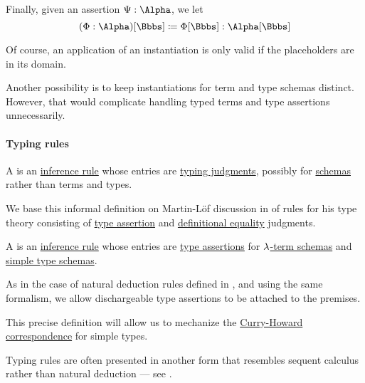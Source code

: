 \begin{definition}
\begin{thmenum}
     Finally, given an assertion \( \Psi: \Alpha \), we let
    \begin{equation}\label{eq:def:lambda_schema_instantiation/assertion}
      (\Phi: \Alpha)[\Bbbs] \coloneqq \Phi[\Bbbs]: \Alpha[\Bbbs]
    \end{equation}
  \end{thmenum}
\end{definition}
\begin{comments}
  \item Of course, an application of an instantiation is only valid if the placeholders are in its domain.

  \item Another possibility is to keep instantiations for term and type schemas distinct. However, that would complicate handling typed terms and type assertions unnecessarily.
\end{comments}

\paragraph{Typing rules}

\begin{concept}\label{con:typing_rule}
  A  is an \hyperref[def:inference_rule]{inference rule} whose entries are \hyperref[rem:typing_judgments]{typing judgments}, possibly for \hyperref[con:schemas_and_instances]{schemas} rather than terms and types.
\end{concept}
\begin{comments}
  \item We base this informal definition on Martin-L\"of discussion in \cite{MartinLöf1984IntTypeTheory} of rules for his type theory consisting of \hyperref[def:type_assertion]{type assertion} and \hyperref[con:definitional_equality]{definitional equality} judgments.
\end{comments}

\begin{definition}\label{def:simple_typing_rule}\mimprovised
  A  is an \hyperref[def:inference_rule]{inference rule} whose entries are \hyperref[def:type_assertion]{type assertions} for \hyperref[def:lambda_term_schema]{\( \mathrm{\lambda} \)-term schemas} and \hyperref[def:simple_type_schema]{simple type schemas}.

  As in the case of natural deduction rules defined in , and using the same formalism, we allow dischargeable type assertions to be attached to the premises.
\end{definition}
\begin{comments}
  \item This precise definition will allow us to mechanize the \hyperref[con:curry_howard_correspondence]{Curry-Howard correspondence} for simple types.

  \item Typing rules are often presented in another form that resembles sequent calculus rather than natural deduction --- see .
\end{comments}

